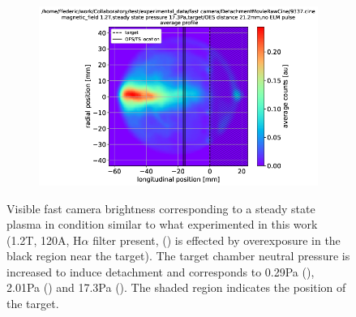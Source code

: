 \begin{figure}
\begin{subfigure}{0.31\textwidth}
     \end{subfigure}
     \hfill
     \begin{subfigure}{0.31\textwidth}
         \centering
         \vspace*{-0mm}
         \includegraphics[width=\textwidth,trim={39 0 17 11},clip]{Chapters/chapter3/figs/fast_camera_9337.cine.png}
         \vspace*{-17mm}
         {\color{white}\caption{\phantom{wewwwww}}\label{fig:SSc}}
     \end{subfigure}
        \vspace*{+6mm}
        \caption{Visible fast camera brightness corresponding to a steady state plasma in condition similar to what experimented in this work (1.2T, 120A, H$\alpha$ filter present, () is effected by overexposure in the black region near the target). The target chamber neutral pressure is increased to induce detachment and corresponds to 0.29Pa (), 2.01Pa () and 17.3Pa (). The shaded region indicates the position of the target.}
        \label{fig:SS}
\end{figure}

